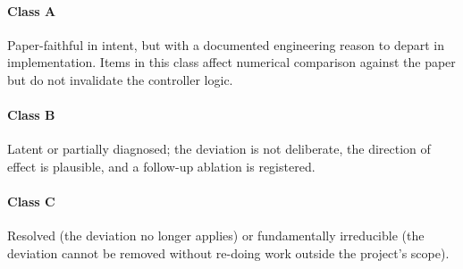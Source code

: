 \documentclass{unnc-fyp}
\begin{document}
\paragraph{Class A}
Paper-faithful in intent, but with a documented engineering reason
to depart in implementation.
Items in this class affect numerical comparison against the paper
but do not invalidate the controller logic.

\paragraph{Class B}
Latent or partially diagnosed; the deviation is not deliberate,
the direction of effect is plausible, and a follow-up ablation is
registered.

\paragraph{Class C}
Resolved (the deviation no longer applies) or fundamentally
irreducible (the deviation cannot be removed without re-doing
work outside the project's scope).
\end{document}
